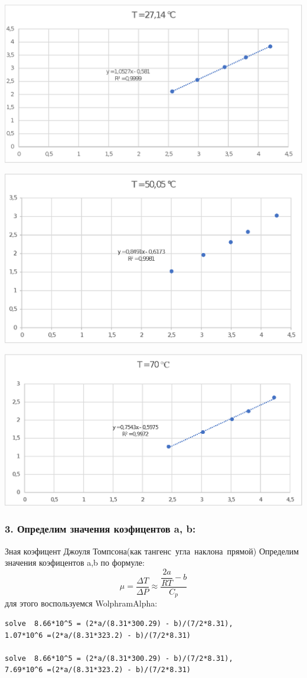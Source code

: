 \documentclass[a4paper,12pt]{article}
\theoremstyle{plain} %
\theoremstyle{definition} %
\theoremstyle{remark} %
\begin{document}
\begin{minipage}{0.5\textwidth}
  {\includegraphics[width=1\linewidth]{Graph1.eps}}
\end{minipage}
\hfill
\begin{minipage}{0.5\textwidth}
  {\includegraphics[width=1\linewidth]{Graph2.eps}}
\end{minipage}

\begin{center}
\includegraphics[width=0.5\linewidth]{Graph3.eps}
\end{center}


\newpage
  
\subsubsection*{3. Определим значения коэфицентов a, b:}Зная коэфицент Джоуля Томпсона(как тангенс\mbox{ угла наклона прямой}) Определим значения коэфицентов a,b по формуле:
\[ \mu = \dfrac{\Delta T}{\Delta P} \approx \dfrac{\dfrac{2a}{RT} - b}{C_p} \]
для этого воспользуемся WolphramAlpha:
\begin{lstlisting}
solve  8.66*10^5 = (2*a/(8.31*300.29) - b)/(7/2*8.31), 
1.07*10^6 =(2*a/(8.31*323.2) - b)/(7/2*8.31)

solve  8.66*10^5 = (2*a/(8.31*300.29) - b)/(7/2*8.31), 
7.69*10^6 =(2*a/(8.31*323.2) - b)/(7/2*8.31)

\end{lstlisting}
\end{document}

